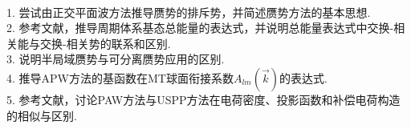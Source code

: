%
%
 
\\
1. 尝试由正交平面波方法推导赝势的排斥势，并简述赝势方法的基本思想.\\
2. 参考文献，推导周期体系基态总能量的表达式，并说明总能量表达式中交换-相关能与交换-相关势的联系和区别.\\
3. 说明半局域赝势与可分离赝势应用的区别.\\
4. 推导APW方法的基函数在MT球面衔接系数$A_{lm}(\vec k)$的表达式.\\
5. 参考文献，讨论PAW方法与USPP方法在电荷密度、投影函数和补偿电荷构造的相似与区别.

